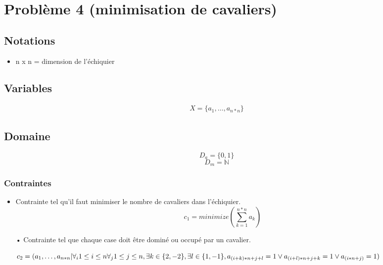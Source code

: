 \documentclass[a4paper,11pt]{article}
\begin{document}
\section{Problème 4 (minimisation de cavaliers)}
\subsection{Notations}
\begin{itemize}
\item n x n = dimension de l'échiquier
\end{itemize}

\subsection{Variables}
\begin{equation}
  \begin{split}
    X = \{a_1, \dots, a_{n*n} \}
  \end{split}
\end{equation}

\subsection{Domaine}
$$D_a = \{ 0, 1 \}$$
$$D_m = \mathbb{N}$$

\subsubsection{Contraintes}
\begin{itemize}
\item Contrainte tel qu'il faut minimiser le nombre de cavaliers dans l'échiquier.
  $$ c_1 = minimize(\sum_{k=1}^{n*n} a_k) $$
  
\item[•] Contrainte tel que chaque case doit être dominé ou occupé par un cavalier.
  
  $ c_2 = (a_1, \dots, a_{n*n} | \forall_i 1 \leq i \leq n \forall_j 1 \leq j \leq n, \exists k \in \{2,-2\}, \exists l \in \{1,-1\}, \\
   a_{(i+k)*n +j +l}=1 \vee a_{(i+l)*n +j +k}=1 \vee a_{(i*n +j)} = 1) $ 
\end{itemize}
\end{document}
